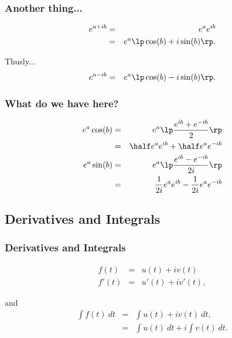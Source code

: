 \begin{frame}
  \frametitle{Another thing...}

  \begin{eqnarray*}
    e^{a+ib} & = & e^a e^{ib} \\
    & = & e^a \lp \cos(b) + i \sin(b) \rp.
  \end{eqnarray*}

  Thusly...
  \begin{eqnarray*}
    e^{a-ib} & = & e^a \lp \cos(b) - i \sin(b) \rp.
  \end{eqnarray*}

\end{frame}


\begin{frame}
  \frametitle{What do we have here?}

  \begin{eqnarray*}
    e^a \cos(b) & = & e^a \lp \frac{e^{ib}+e^{-ib}}{2} \rp \\
    & = & \half e^a e^{ib} +\half e^a  e^{-ib} \\
    e^a \sin(b) & = & e^a \lp \frac{e^{ib}-e^{-ib}}{2i} \rp \\
    & = & \frac{1}{2i} e^a e^{ib} - \frac{1}{2i} e^a e^{-ib}
  \end{eqnarray*}

\end{frame}

\subsection{Derivatives and Integrals}

\begin{frame}
  \frametitle{Derivatives and Integrals}

  \begin{eqnarray*}
    f(t) & = & u(t) + i v(t) \\
    f'(t) & = & u'(t) + i v'(t),
  \end{eqnarray*}

  and
  \begin{eqnarray*}
    \int f(t) ~ dt & = & \int u(t) + i v(t) ~ dt, \\
    & = & \int u(t) ~ dt + i \int v(t) ~ dt.
  \end{eqnarray*}

\end{frame}


